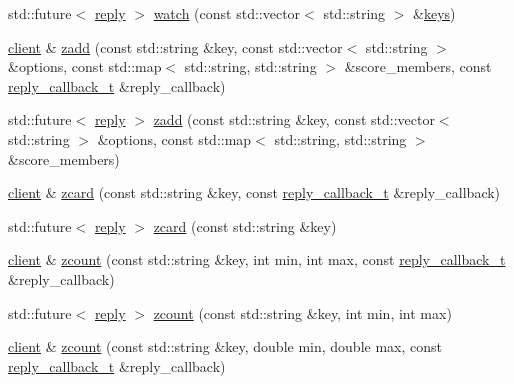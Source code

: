 \begin{DoxyCompactItemize}
\item 
std\+::future$<$ \hyperlink{classcpp__redis_1_1reply}{reply} $>$ \hyperlink{classcpp__redis_1_1client_a437606353878a903033ced5cb56ed07c}{watch} (const std\+::vector$<$ std\+::string $>$ \&\hyperlink{classcpp__redis_1_1client_acb7845a206b2321e6919c2f38282c322}{keys})
\item 
\hyperlink{classcpp__redis_1_1client}{client} \& \hyperlink{classcpp__redis_1_1client_aaea3a3c79956cabb6709fb6cd3e01739}{zadd} (const std\+::string \&key, const std\+::vector$<$ std\+::string $>$ \&options, const std\+::map$<$ std\+::string, std\+::string $>$ \&score\+\_\+members, const \hyperlink{classcpp__redis_1_1client_a061a1140d36d2eaeda82b09a0bb3f9f2}{reply\+\_\+callback\+\_\+t} \&reply\+\_\+callback)
\item 
std\+::future$<$ \hyperlink{classcpp__redis_1_1reply}{reply} $>$ \hyperlink{classcpp__redis_1_1client_a9c6ec329f626304b629c6ff17ea9bc6b}{zadd} (const std\+::string \&key, const std\+::vector$<$ std\+::string $>$ \&options, const std\+::map$<$ std\+::string, std\+::string $>$ \&score\+\_\+members)
\item 
\hyperlink{classcpp__redis_1_1client}{client} \& \hyperlink{classcpp__redis_1_1client_a54259186a650211cc8b5fb70af1384ba}{zcard} (const std\+::string \&key, const \hyperlink{classcpp__redis_1_1client_a061a1140d36d2eaeda82b09a0bb3f9f2}{reply\+\_\+callback\+\_\+t} \&reply\+\_\+callback)
\item 
std\+::future$<$ \hyperlink{classcpp__redis_1_1reply}{reply} $>$ \hyperlink{classcpp__redis_1_1client_a9cfeae7394f3fa2b3ff7ec1f1c56ca1b}{zcard} (const std\+::string \&key)
\item 
\hyperlink{classcpp__redis_1_1client}{client} \& \hyperlink{classcpp__redis_1_1client_a405463c110eb39e66163f0d936e42815}{zcount} (const std\+::string \&key, int min, int max, const \hyperlink{classcpp__redis_1_1client_a061a1140d36d2eaeda82b09a0bb3f9f2}{reply\+\_\+callback\+\_\+t} \&reply\+\_\+callback)
\item 
std\+::future$<$ \hyperlink{classcpp__redis_1_1reply}{reply} $>$ \hyperlink{classcpp__redis_1_1client_a7965bc6ab1198ca3bb5b31c10da95c34}{zcount} (const std\+::string \&key, int min, int max)
\item 
\hyperlink{classcpp__redis_1_1client}{client} \& \hyperlink{classcpp__redis_1_1client_a648afc3a38da6413e6b735d2708c3fe3}{zcount} (const std\+::string \&key, double min, double max, const \hyperlink{classcpp__redis_1_1client_a061a1140d36d2eaeda82b09a0bb3f9f2}{reply\+\_\+callback\+\_\+t} \&reply\+\_\+callback)

\end{DoxyCompactItemize}
